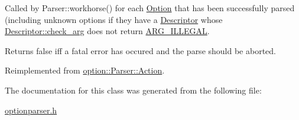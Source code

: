 \-Called by \-Parser\-::workhorse() for each \hyperlink{classoption_1_1_option}{\-Option} that has been successfully parsed (including unknown options if they have a \hyperlink{structoption_1_1_descriptor}{\-Descriptor} whose \hyperlink{structoption_1_1_descriptor_aa5d675dba0214a4abd73007ff163cc67}{\-Descriptor\-::check\-\_\-arg} does not return \hyperlink{namespaceoption_aee8c76a07877335762631491e7a5a1a9a9528e32563b795bd2930b12d0a5e382d}{\-A\-R\-G\-\_\-\-I\-L\-L\-E\-G\-A\-L}. 

\-Returns {\ttfamily false} iff a fatal error has occured and the parse should be aborted. 

\-Reimplemented from \hyperlink{structoption_1_1_parser_1_1_action_a176b5f783bb35eb015b6d2c09422457d}{option\-::\-Parser\-::\-Action}.



\-The documentation for this class was generated from the following file\-:\begin{DoxyCompactItemize}
\item 
\hyperlink{optionparser_8h}{optionparser.\-h}\end{DoxyCompactItemize}
